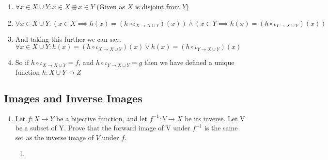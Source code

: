 \documentclass{article}
\begin{document}
\begin{enumerate}
\begin{enumerate}
\begin{enumerate}
                        \item $\forall x \in X \cup Y: x \in X \oplus x \in Y$ (Given as $X$ is disjoint from $Y$)
                        \item $\forall x \in X \cup Y: (x \in X \implies h(x) = (h \circ {\iota}_{X \rightarrow X \cup Y})(x)) \land (x \in Y \implies h(x) = (h \circ {\iota}_{Y \rightarrow X \cup Y})(x))$
                        \item And taking this further we can say: $\forall
                            x \in X \cup Y: h(x) = (h \circ {\iota}_{X
                            \rightarrow X \cup Y})(x) \lor h(x) = (h \circ
                            {\iota}_{Y \rightarrow X \cup Y})(x)$
                        \item So if $h \circ {\iota}_{X \rightarrow X \cup Y} =
                            f$, and $h \circ {\iota}_{Y \rightarrow X \cup Y} =
                            g$ then we have defined a unique function $h: X
                            \cup Y \rightarrow Z$ 
                    \end{enumerate}
            \end{enumerate}
    \end{enumerate}
    \subsection{Images and Inverse Images}
    \begin{enumerate}
        \item Let $f: X \rightarrow Y$ be a bijective function, and let
            $f^{-1}: Y \rightarrow X$ be its inverse.  Let V be a subset of Y.
            Prove that the forward image of V under $f^{-1}$ is the same set as
            the inverse image of $V$ under $f$.
            \begin{enumerate}
                \item 
            \end{enumerate}
            
    \end{enumerate}
\end{document}
